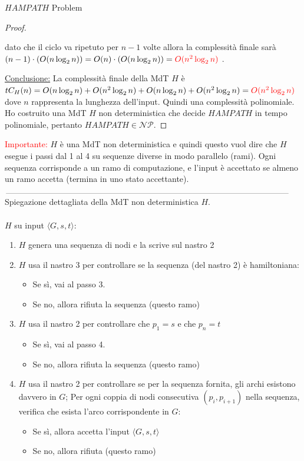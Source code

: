 \documentclass{article}  %
\theoremstyle{definition}
\begin{document}
\begin{theorem}{$HAMPATH$ Problem}
\begin{proof}
\begin{enumerate}
{				      dato che il ciclo va ripetuto per $n-1$ volte allora la complessità finale sarà $(n-1)\cdot(O(n\log_2n))=O(n)\cdot(O(n\log_2n))
					      =\textcolor{red}{O(n^2\log_2n)}$
			      }.
		\end{enumerate}
		\underline{Conclusione:} La complessità finale della MdT $H$ è $tC_H(n)=O(n\log_2n)+O(n^2\log_2n)+O(n\log_2n)+O(n^2\log_2n)=\textcolor{red}{O(n^2\log_2n)}$ dove
		$n$ rappresenta la lunghezza dell'input. Quindi una complessità polinomiale. Ho costruito una MdT $H$ non deterministica che decide $HAMPATH$ in
		tempo polinomiale, pertanto $HAMPATH \in \mathcal{NP}$.
	\end{proof}
	\textcolor{red}{Importante:} $H$ è una MdT non deterministica e quindi questo vuol dire che $H$ esegue i passi dal 1 al 4
	su sequenze diverse in modo parallelo (rami). Ogni sequenza corrisponde a un ramo di computazione, e
	l'input è accettato se almeno un ramo accetta (termina in uno stato accettante).
	$\rule{\linewidth}{0.3pt}$  %
	Spiegazione dettagliata della MdT non deterministica $H$. \\ \\
	$H$ su input $\langle G,s,t \rangle$:
	\begin{enumerate}
		\item $H$ genera una sequenza di nodi e la scrive sul nastro 2
		\item $H$ usa il nastro 3 per controllare se la sequenza (del nastro 2) è hamiltoniana:
		      \begin{itemize}
			      \item Se sì, vai al passo 3.
			      \item Se no, allora rifiuta la sequenza (questo ramo)
		      \end{itemize}
		\item $H$ usa il nastro 2 per controllare che $p_1=s$ e che $p_n=t$
		      \begin{itemize}
			      \item Se sì, vai al passo 4.
			      \item Se no, allora rifiuta la sequenza (questo ramo)
		      \end{itemize}
		\item $H$ usa il nastro 2 per controllare se per la sequenza fornita, gli archi esistono davvero in $G$;
		      Per ogni coppia di nodi consecutiva $(p_i, p_{i+1})$ nella sequenza, verifica che esista l'arco corrispondente in $G$:
		      \begin{itemize}
			      \item Se sì, allora accetta l'input $\langle G,s,t \rangle$
			      \item Se no, allora rifiuta (questo ramo)
		      \end{itemize}
	\end{enumerate}
\end{theorem}
\end{document}
